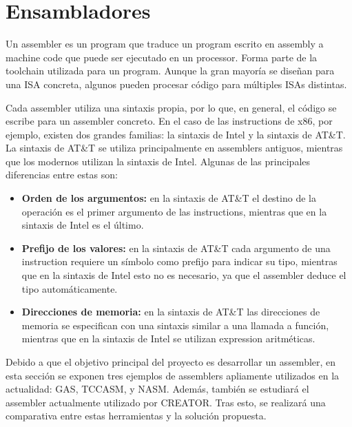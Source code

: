 
\section{Ensambladores}\label{sec:assemblers}

Un \gls{assembler} es un \gls{program} que traduce un \gls{program} escrito en
\gls{assembly} a \gls{machine code} que puede ser ejecutado en un
\gls{processor}. Forma parte de la \gls{toolchain} utilizada para
 un \gls{program}. Aunque la gran mayoría se
diseñan para una \gls{ISA} concreta, algunos pueden procesar código para
múltiples \glspl{ISA} distintas.

Cada \gls{assembler} utiliza una sintaxis propia, por lo que, en general, el
código se escribe para un \gls{assembler} concreto. En el caso de las
\glspl{instruction} de x86, por ejemplo, existen dos grandes familias: la
sintaxis de Intel y la sintaxis de AT\&T. La sintaxis de AT\&T se utiliza
principalmente en \glspl{assembler} antiguos, mientras que los modernos utilizan
la sintaxis de Intel. Algunas de las principales diferencias entre estas son:
\parencite{assembler-usage}

\begin{itemize}
    \item \textbf{Orden de los argumentos:} en la sintaxis de AT\&T el destino
    de la operación es el primer argumento de las \glspl{instruction}, mientras
    que en la sintaxis de Intel es el último.
    \item \textbf{Prefijo de los valores:} en la sintaxis de AT\&T cada
    argumento de una \gls{instruction} requiere un símbolo como prefijo para
    indicar su tipo, mientras que en la sintaxis de Intel esto no es necesario,
    ya que el \gls{assembler} deduce el tipo automáticamente.
    \item \textbf{Direcciones de memoria:} en la sintaxis de AT\&T las
    direcciones de memoria se especifican con una sintaxis similar a una llamada
    a función, mientras que en la sintaxis de Intel se utilizan \gls{expression}
    aritméticas.
\end{itemize}

Debido a que el objetivo principal del proyecto es desarrollar un
\gls{assembler}, en esta sección se exponen tres ejemplos de \glspl{assembler}
apliamente utilizados en la actualidad: \gls{GAS}, TCCASM, y NASM. Además,
también se estudiará el \gls{assembler} actualmente utilizado por CREATOR. Tras
esto, se realizará una comparativa entre estas herramientas y la solución
propuesta.

